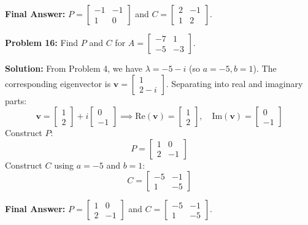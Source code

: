 \documentclass[11pt, letterpaper]{article}
\theoremstyle{definition}
\theoremstyle{remark}
\begin{document}
\textbf{Final Answer:} $P = \begin{bmatrix} -1 & -1 \\ 1 & 0 \end{bmatrix}$ and $C = \begin{bmatrix} 2 & -1 \\ 1 & 2 \end{bmatrix}$.

\vspace{1em}

\textbf{Problem 16:} Find $P$ and $C$ for $A = \begin{bmatrix} -7 & 1 \\ -5 & -3 \end{bmatrix}$.

\textbf{Solution:}
From Problem 4, we have $\lambda = -5 - i$ (so $a = -5, b = 1$).
The corresponding eigenvector is $\mathbf{v} = \begin{bmatrix} 1 \\ 2 - i \end{bmatrix}$.
Separating into real and imaginary parts:
\[
\mathbf{v} = \begin{bmatrix} 1 \\ 2 \end{bmatrix} + i \begin{bmatrix} 0 \\ -1 \end{bmatrix} \implies \text{Re}(\mathbf{v}) = \begin{bmatrix} 1 \\ 2 \end{bmatrix}, \quad \text{Im}(\mathbf{v}) = \begin{bmatrix} 0 \\ -1 \end{bmatrix}
\]
Construct $P$:
\[
P = \begin{bmatrix} 1 & 0 \\ 2 & -1 \end{bmatrix}
\]
Construct $C$ using $a = -5$ and $b = 1$:
\[
C = \begin{bmatrix} -5 & -1 \\ 1 & -5 \end{bmatrix}
\]

\textbf{Final Answer:} $P = \begin{bmatrix} 1 & 0 \\ 2 & -1 \end{bmatrix}$ and $C = \begin{bmatrix} -5 & -1 \\ 1 & -5 \end{bmatrix}$.
\end{document}
